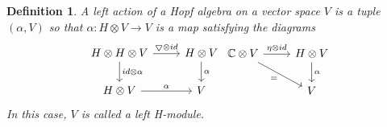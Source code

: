 \documentclass[12pt,a4paper]{article}
\newtheorem{definition}[theorem]{Definition}
\newcommand\1{_{(1)}}
\newcommand\2{_{(2)}}
\begin{document}
\begin{definition} A left action of a Hopf algebra on a vector space $V$ is a tuple $(\alpha, V)$ so that
$\alpha:H\otimes V\to V$ is a map satisfying the diagrams
\[
\begin{tikzcd}
H\otimes H\otimes V \arrow[r, "\bigtriangledown\otimes id"] \arrow[d, "id\otimes \alpha"] & H\otimes V \arrow[d, "\alpha"] \\
H\otimes V \arrow[r, "\alpha"]                                                         & V                             
\end{tikzcd}
\begin{tikzcd}
\mathbb{C}\otimes V \arrow[r, "\eta\otimes id"] \arrow[rd, "="'] & H\otimes V \arrow[d, "\alpha"] \\
                                                          & V                             
\end{tikzcd}
\]
In this case, $V$ is called a left H-module.
\end{definition}
\end{document}
